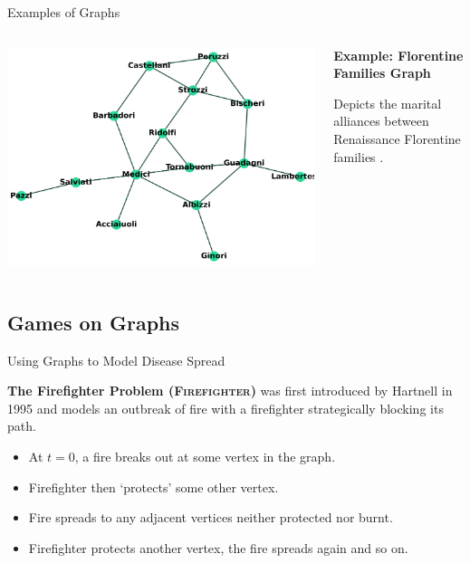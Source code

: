 \documentclass[unknownkeysallowed]{beamer}
\begin{document}
\begin{frame}{Examples of Graphs}

\begin{columns}

\begin{column}{.6\textwidth}
\includegraphics[width=.8\linewidth,valign=t]{assets/florentine}
\end{column}

\begin{column}{.4\textwidth}
\textbf{Example: Florentine Families Graph}
\vspace{5pt}

Depicts the marital alliances between Renaissance Florentine families \cite{padgett_1993}.

\end{column}

\end{columns}

\end{frame}

\subsection{Games on Graphs}

\begin{frame}{Using Graphs to Model Disease Spread}

\textbf{The Firefighter Problem ({\scshape Firefighter})} was first introduced by Hartnell in 1995 \cite{hartnell_1995}
and models an outbreak of fire with a firefighter strategically blocking its path.

\begin{itemize}
	\pause
	\item At $t=0$, a fire breaks out at some vertex in the graph.
	\pause
	\item Firefighter then `protects' some other vertex.
	\pause
	\item Fire spreads to any adjacent vertices neither protected nor burnt. 
	\pause
	\item Firefighter protects another vertex, the fire spreads again and so on.
\end{itemize}

\end{frame}
\end{document}
